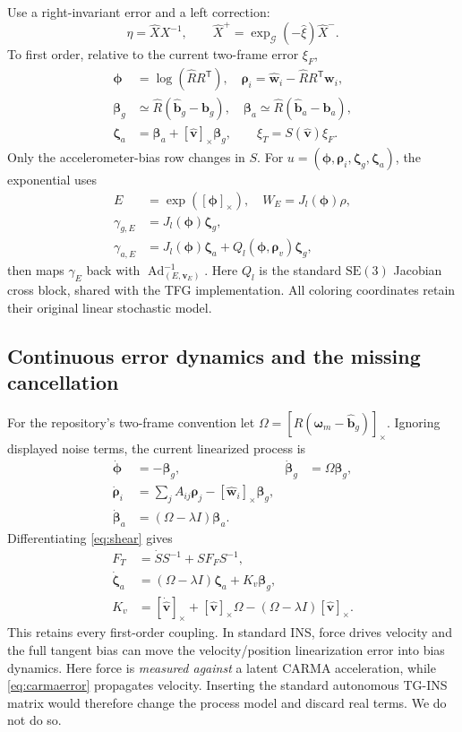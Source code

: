 \documentclass[conference]{IEEEtran}
\newcommand{\vc}[1]{\bm{#1}}
\newcommand{\sk}[1]{[#1]_\times}
\newcommand{\tr}{^{\mathsf T}}
\begin{document}
Use a right-invariant error and a left correction:
\begin{equation}
 \eta=\hat X X^{-1},\qquad \hat X^+=\exp_{\mathcal G}(-\hat\xi)\hat X^-.
\end{equation}
To first order, relative to the current two-frame error $\xi_F$,
\begin{align}
 \vc\phi&=\log(\hat R R\tr),\quad
 \vc\rho_i=\hat{\vc w}_i-\hat R R\tr\vc w_i,\\
 \vc\beta_g&\simeq\hat R(\hat{\vc b}_g-\vc b_g),\quad
 \vc\beta_a\simeq\hat R(\hat{\vc b}_a-\vc b_a),\\
 \vc\zeta_a&=\vc\beta_a+\sk{\hat{\vc v}}\vc\beta_g,
 \qquad \xi_T=S(\hat{\vc v})\xi_F.\label{eq:shear}
\end{align}
Only the accelerometer-bias row changes in $S$. For
$u=(\vc\phi,\vc\rho_i,\vc\zeta_g,\vc\zeta_a)$, the exponential uses
\begin{align}
 E&=\exp(\sk{\vc\phi}),\quad W_E=J_l(\vc\phi)\rho,\\
 \gamma_{g,E}&=J_l(\vc\phi)\vc\zeta_g,\\
 \gamma_{a,E}&=J_l(\vc\phi)\vc\zeta_a+
 Q_l(\vc\phi,\vc\rho_v)\vc\zeta_g,
\end{align}
then maps $\gamma_E$ back with
$\operatorname{Ad}_{(E,\vc v_E)}^{-1}$. Here $Q_l$ is the standard
$\mathrm{SE}(3)$ Jacobian cross block, shared with the TFG implementation.
All coloring coordinates retain their original linear stochastic model.

\subsection{Continuous error dynamics and the missing cancellation}
For the repository's two-frame convention let
$\Omega=\sk{\hat R(\vc\omega_m-\hat{\vc b}_g)}$. Ignoring displayed noise
terms, the current linearized process is
\begin{align}
 \dot{\vc\phi}&=-\vc\beta_g,&
 \dot{\vc\beta}_g&=\Omega\vc\beta_g,\\
 \dot{\vc\rho}_i&=\sum_j A_{ij}\vc\rho_j-
                \sk{\hat{\vc w}_i}\vc\beta_g,\label{eq:carmaerror}\\
 \dot{\vc\beta}_a&=(\Omega-\lambda I)\vc\beta_a.
\end{align}
Differentiating \cref{eq:shear} gives
\begin{align}
 F_T&=\dot S S^{-1}+S F_F S^{-1},\label{eq:ft}\\
 \dot{\vc\zeta}_a&=(\Omega-\lambda I)\vc\zeta_a+K_v\vc\beta_g,\\
 K_v&=\sk{\dot{\hat{\vc v}}}+\sk{\hat{\vc v}}\Omega
       -(\Omega-\lambda I)\sk{\hat{\vc v}}.
\end{align}
This retains every first-order coupling. In standard INS, force drives
velocity and the full tangent bias can move the velocity/position
linearization error into bias dynamics. Here force is \emph{measured
against} a latent CARMA acceleration, while \cref{eq:carmaerror} propagates
velocity. Inserting the standard autonomous TG-INS matrix would therefore
change the process model and discard real terms. We do not do so.
\end{document}
